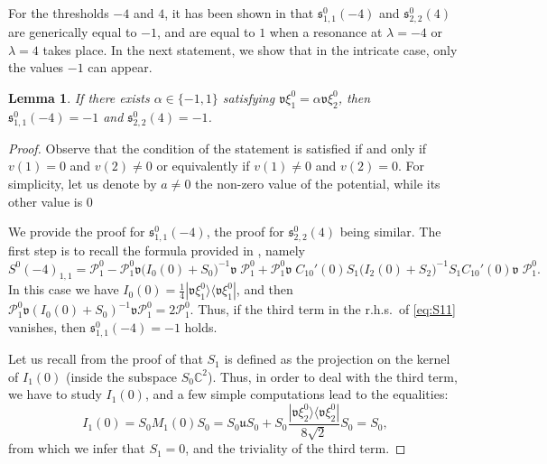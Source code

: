 \documentclass[11pt]{article}
\def\C{\mathbb C}
\def\P{\mathcal P}
\def\s{\mathfrak s}
\def\u{\mathfrak u}
\def\v{\mathfrak v}
\newtheorem{Lemma}[Theorem]{Lemma}
\begin{document}
For the thresholds $-4$ and $4$, it has been shown in \cite[Lem.~4.3]{APRR} that $\s^0_{1,1}(-4)$ and $\s^0_{2,2}(4)$
are generically equal to $-1$, and are equal to $1$ when a resonance at $\lambda=-4$ or $\lambda=4$ takes place. In the next statement, we show that in the intricate case, only 
the values $-1$ can appear.

\begin{Lemma}\label{lem_bb}
If there exists $\alpha\in \{-1,1\}$ satisfying $\v\xi^0_{1}=\alpha \v \xi^0_2$,
then $\s^0_{1,1}(-4)=-1$ and $\s^0_{2,2}(4)=-1$.
\end{Lemma}
 
\begin{proof}
Observe that the condition of the statement is satisfied if and only if $v(1)=0$ and $v(2)\neq 0$ or
equivalently if $v(1)\neq 0$ and $v(2)=0$. For simplicity, let us denote by $a\neq 0$ the non-zero value of the potential, while its other value is $0$

We provide the proof for $\s_{1,1}^0(-4)$, the proof for $\s^0_{2,2}(4)$ being similar.
The first step is to recall the formula provided in \cite[Thm.~3.9.(b)]{NRT}, namely
\begin{equation}\label{eq:S11}
S^0(-4)_{1,1}
=\P_1^0-\P_1^0\v\big(I_0(0)+S_0\big)^{-1}\v\;\!\P_{1}^0
+\P_1^0\v\;\!C_{10}'(0)S_1\big(I_2(0)+S_2\big)^{-1}S_1C_{10}'(0)\v\;\!
\P_{1}^0.
\end{equation}
In this case we have $I_0(0)=\frac{1}{4}|\v\xi_1^0\rangle \langle \v\xi_1^0|$, and then
$\P_1^0\v(I_0(0)+S_0)^{-1}\v\P_1^0=2\P_1^0$. Thus, if the  third term in the r.h.s.~of \eqref{eq:S11} vanishes, then $\s_{1,1}^0(-4)=-1$ holds.

Let us recall from the proof of \cite[Prop.~3.5]{NRT} that $S_1$ is defined as the projection on the kernel of $I_1(0)$ (inside the subspace $S_0\C^2$). Thus, in order to deal with the third term, we have to study $I_1(0)$, and a few simple computations lead to the equalities:
\begin{equation*}
I_1(0) 
= S_0 M_1(0) S_0 
= S_0\u S_0+S_0\frac{|\v \xi_2^0\rangle \langle \v \xi_2^0|}{8\sqrt{2}}S_0
=S_0,
\end{equation*}
from which we infer that $S_1=0$, and the triviality of the third term.  
\end{proof}
\end{document}
